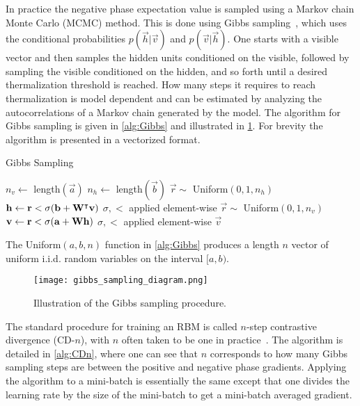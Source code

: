 In practice the negative phase expectation value is sampled using a Markov chain Monte Carlo (MCMC) method.
This is done using Gibbs sampling~\cite{hinton_rbm_training}, which uses the conditional probabilities \( p(\vec{h}|\vec{v}) \) and \( p(\vec{v}|\vec{h}) \).
One starts with a visible vector and then samples the hidden units conditioned on the visible, followed by sampling the visible conditioned on the hidden, and so forth until a desired thermalization threshold is reached.
How many steps it requires to reach thermalization is model dependent and can be estimated by analyzing the autocorrelations of a Markov chain generated by the model.
The algorithm for Gibbs sampling is given in \cref{alg:Gibbs} and illustrated in \cref{fig:gibbs_sampling_diagram}.
For brevity the algorithm is presented in a vectorized format.

\begin{algorithm}
\caption{Gibbs Sampling}
\begin{algorithmic}[1]
        \State $n_v \gets$ length$(\vec{a})$
        \State $n_h \gets$ length$(\vec{b})$
            \State $\vec{r} \sim$ Uniform$(0, 1, n_h)$
            \State $\mathbf{h} \gets \mathbf{r} < \sigma(\mathbf{b} + \mathbf{W}^\intercal\mathbf{v})$
                \Comment $\sigma, <$ applied element-wise
            \State $\vec{r} \sim$ Uniform$(0, 1, n_v)$
            \State $\mathbf{v} \gets \mathbf{r} < \sigma(\mathbf{a} + \mathbf{W}\mathbf{h})$
                \Comment $\sigma, <$ applied element-wise
        \EndFor
        \State \Return $\vec{v}$
    \EndProcedure
\end{algorithmic}
\label{alg:Gibbs}
\end{algorithm}
The Uniform$(a, b, n)$ function in \cref{alg:Gibbs} produces a length \( n \) vector of uniform i.i.d. random variables on the interval $[a, b)$.

\begin{figure}
    \begin{center}
        \texttt{[image: gibbs\_sampling\_diagram.png]}
    \end{center}
    \caption{Illustration of the Gibbs sampling procedure.}
    \label{fig:gibbs_sampling_diagram}
\end{figure}

The standard procedure for training an RBM is called \( n \)-step contrastive divergence (CD-\( n \)), with \( n \) often taken to be one in practice~\cite{hinton_rbm_training}.
The algorithm is detailed in \cref{alg:CDn}, where one can see that \( n \) corresponds to how many Gibbs sampling steps are between the positive and negative phase gradients.
Applying the algorithm to a mini-batch is essentially the same except that one divides the learning rate by the size of the mini-batch to get a mini-batch averaged gradient.

